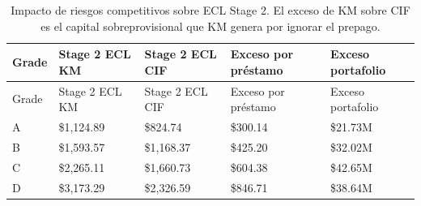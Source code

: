 \documentclass[
  spanish,
  11pt,
  letterpaper,
]{scrbook}
\theoremstyle{plain}
\theoremstyle{remark}
\begin{document}
\begin{longtable}[]{@{}
  >{\raggedright\arraybackslash}p{}
  >{\raggedleft\arraybackslash}p{}
  >{\raggedleft\arraybackslash}p{}
  >{\raggedleft\arraybackslash}p{}
  >{\raggedleft\arraybackslash}p{}@{}}
\caption{Impacto de riesgos competitivos sobre ECL Stage 2. El exceso de
KM sobre CIF es el capital sobreprovisional que KM genera por ignorar el
prepago.}\label{tbl-cif-ecl}\tabularnewline
\toprule\noalign{}
\begin{minipage}[b]{\linewidth}\raggedright
Grade
\end{minipage} & \begin{minipage}[b]{\linewidth}\raggedleft
Stage 2 ECL KM
\end{minipage} & \begin{minipage}[b]{\linewidth}\raggedleft
Stage 2 ECL CIF
\end{minipage} & \begin{minipage}[b]{\linewidth}\raggedleft
Exceso por préstamo
\end{minipage} & \begin{minipage}[b]{\linewidth}\raggedleft
Exceso portafolio
\end{minipage} \\
\midrule\noalign{}
\endfirsthead
\toprule\noalign{}
\begin{minipage}[b]{\linewidth}\raggedright
Grade
\end{minipage} & \begin{minipage}[b]{\linewidth}\raggedleft
Stage 2 ECL KM
\end{minipage} & \begin{minipage}[b]{\linewidth}\raggedleft
Stage 2 ECL CIF
\end{minipage} & \begin{minipage}[b]{\linewidth}\raggedleft
Exceso por préstamo
\end{minipage} & \begin{minipage}[b]{\linewidth}\raggedleft
Exceso portafolio
\end{minipage} \\
\midrule\noalign{}
\endhead
\bottomrule\noalign{}
\endlastfoot
A & \$1,124.89 & \$824.74 & \$300.14 & \$21.73M \\
B & \$1,593.57 & \$1,168.37 & \$425.20 & \$32.02M \\
C & \$2,265.11 & \$1,660.73 & \$604.38 & \$42.65M \\
D & \$3,173.29 & \$2,326.59 & \$846.71 & \$38.64M \\
\end{longtable}
\end{document}
